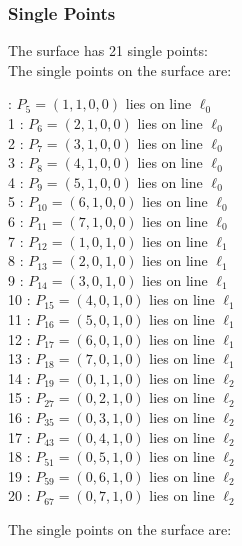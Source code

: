 \documentclass{article}
\begin{document}
{\subsubsection*{Single Points}
The surface has 21 single points:\\
The single points on the surface are:\\
\begin{multicols}{2}
 : $P_{5}=( 1, 1, 0, 0 )$ lies on line $\ell_{0}$\\
1 : $P_{6}=( 2, 1, 0, 0 )$ lies on line $\ell_{0}$\\
2 : $P_{7}=( 3, 1, 0, 0 )$ lies on line $\ell_{0}$\\
3 : $P_{8}=( 4, 1, 0, 0 )$ lies on line $\ell_{0}$\\
4 : $P_{9}=( 5, 1, 0, 0 )$ lies on line $\ell_{0}$\\
5 : $P_{10}=( 6, 1, 0, 0 )$ lies on line $\ell_{0}$\\
6 : $P_{11}=( 7, 1, 0, 0 )$ lies on line $\ell_{0}$\\
7 : $P_{12}=( 1, 0, 1, 0 )$ lies on line $\ell_{1}$\\
8 : $P_{13}=( 2, 0, 1, 0 )$ lies on line $\ell_{1}$\\
9 : $P_{14}=( 3, 0, 1, 0 )$ lies on line $\ell_{1}$\\
10 : $P_{15}=( 4, 0, 1, 0 )$ lies on line $\ell_{1}$\\
11 : $P_{16}=( 5, 0, 1, 0 )$ lies on line $\ell_{1}$\\
12 : $P_{17}=( 6, 0, 1, 0 )$ lies on line $\ell_{1}$\\
13 : $P_{18}=( 7, 0, 1, 0 )$ lies on line $\ell_{1}$\\
14 : $P_{19}=( 0, 1, 1, 0 )$ lies on line $\ell_{2}$\\
15 : $P_{27}=( 0, 2, 1, 0 )$ lies on line $\ell_{2}$\\
16 : $P_{35}=( 0, 3, 1, 0 )$ lies on line $\ell_{2}$\\
17 : $P_{43}=( 0, 4, 1, 0 )$ lies on line $\ell_{2}$\\
18 : $P_{51}=( 0, 5, 1, 0 )$ lies on line $\ell_{2}$\\
19 : $P_{59}=( 0, 6, 1, 0 )$ lies on line $\ell_{2}$\\
20 : $P_{67}=( 0, 7, 1, 0 )$ lies on line $\ell_{2}$\\
\end{multicols}
The single points on the surface are:\\
}
\end{document}
